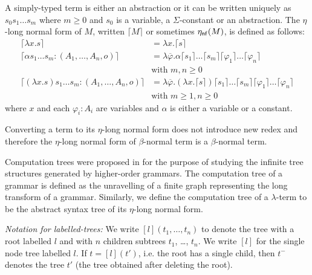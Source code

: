 \documentclass{llncs}
\newcommand\aux[1]{\lceil #1\rceil}
\newcommand\etanf[1]{\eta_{\sf nf}(#1)}
\begin{document}
\begin{definition}
A simply-typed term is either an abstraction or it can be written uniquely as
$s_0 s_1 \ldots s_m$ where $m\geq0$ and $s_0$ is a variable, a $\Sigma$-constant or an abstraction.
The $\eta$-long normal form of $M$, written $\aux{M}$ or sometimes $\etanf{M}$,
is defined as follows:
\begin{align*}
\aux{\lambda x . s } &= \lambda x . \aux{s} \\
\aux{\alpha s_1 \ldots s_m : (A_1,\ldots,A_n,o)} &= \lambda \overline{\varphi} . \alpha \aux{s_1}\ldots \aux{s_m} \aux{\varphi_1} \ldots \aux{\varphi_n} \\
& \mbox{with $m,n\geq0$}\\
\aux{(\lambda x . s) s_1 \ldots s_m : (A_1,\ldots,A_n,o) } &= \lambda \overline{\varphi} . (\lambda x . \aux{s}) \aux{s_1} \ldots \aux{s_m} \aux{\varphi_1} \ldots \aux{\varphi_n} \\
& \mbox{with $m\geq 1,n\geq0$}
\end{align*}
where $x$ and each $\varphi_i : A_i$ are variables and $\alpha$ is
either a variable or a constant.
\end{definition}

\begin{remark}
Converting a term to its $\eta$-long normal form does not introduce new redex and therefore
the $\eta$-long normal form of $\beta$-normal term is a $\beta$-normal term.
\end{remark}

Computation trees were proposed in \cite{OngHoMchecking2006} for the purpose of studying the infinite tree structures generated by higher-order grammars. The computation tree of a grammar is defined as the unravelling of a finite graph representing the long transform of a grammar. Similarly, we define the computation tree of a $\lambda$-term to be the abstract syntax tree of its $\eta$-long normal form.

\emph{Notation for labelled-trees:} We write $[l](t_1, \ldots, t_n)$ to denote the tree with a root labelled $l$ and with $n$ children subtrees $t_1$, \ldots, $t_n$. We write $[l]$ for the single node tree labelled $l$. If $t = [l](t')$, i.e. the root has a single child, then $t^-$ denotes the tree $t'$ (the tree obtained after deleting the root).
\end{document}
